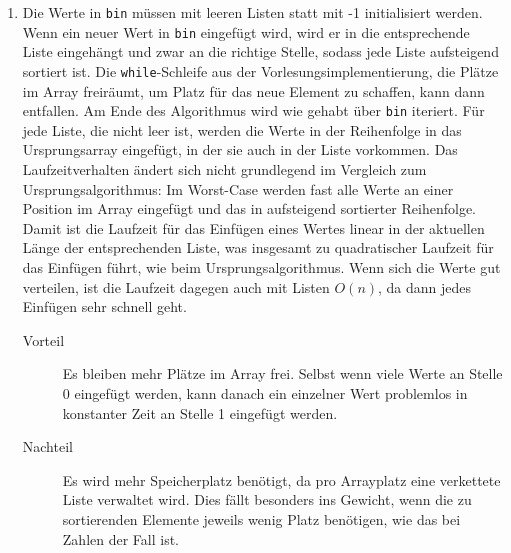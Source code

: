 \documentclass[11pt,a4paper]{article}
\begin{document}
\begin{loesung}
\begin{enumerate}
        \item
        Die Werte in \texttt{bin} müssen mit leeren Listen statt mit -1 initialisiert werden.
        Wenn ein neuer Wert in \texttt{bin} eingefügt wird, wird er in die entsprechende Liste eingehängt und zwar an die richtige Stelle, sodass jede Liste aufsteigend sortiert ist.
        Die \texttt{while}-Schleife aus der Vorlesungsimplementierung, die Plätze im Array freiräumt, um Platz für das neue Element zu schaffen, kann dann entfallen.
        Am Ende des Algorithmus wird wie gehabt über \texttt{bin} iteriert.
        Für jede Liste, die nicht leer ist, werden die Werte in der Reihenfolge in das Ursprungsarray eingefügt, in der sie auch in der Liste vorkommen.
        Das Laufzeitverhalten ändert sich nicht grundlegend im Vergleich zum Ursprungsalgorithmus: Im Worst-Case werden fast alle Werte an einer Position im Array eingefügt und das in aufsteigend sortierter Reihenfolge.
        Damit ist die Laufzeit für das Einfügen eines Wertes linear in der aktuellen Länge der entsprechenden Liste, was insgesamt zu quadratischer Laufzeit für das Einfügen führt, wie beim Ursprungsalgorithmus.
        Wenn sich die Werte gut verteilen, ist die Laufzeit dagegen auch mit Listen $O(n)$, da dann jedes Einfügen sehr schnell geht.

        \begin{description}
            \item[Vorteil] Es bleiben mehr Plätze im Array frei.
            Selbst wenn viele Werte an Stelle 0 eingefügt werden, kann danach ein einzelner Wert problemlos in konstanter Zeit an Stelle 1 eingefügt werden.
            \item[Nachteil] Es wird mehr Speicherplatz benötigt, da pro Arrayplatz eine verkettete Liste verwaltet wird.
            Dies fällt besonders ins Gewicht, wenn die zu sortierenden Elemente jeweils wenig Platz benötigen, wie das bei Zahlen der Fall ist. 
        \end{description}


\end{enumerate}
\end{loesung}
\end{document}
